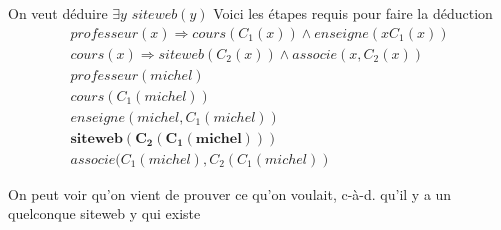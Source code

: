 \documentclass[oneside]{book}
\begin{document}
\noindent On veut déduire $\exists y$ $siteweb(y)$
\noindent Voici les étapes requis pour faire la déduction
\setcounter{equation}{0}
\begin{align}
professeur(x) \Rightarrow cours(C_1(x))\wedge enseigne(x C_1(x))\\
cours(x)\Rightarrow siteweb(C_2(x))\wedge associe(x, C_2(x))\\
professeur(michel)\\
cours(C_1(michel))\\
enseigne(michel, C_1(michel))\\
\mathbf{siteweb(C_2(C_1(michel)))}\\
associe(C_1(michel), C_2(C_1(michel))
\end{align}

On peut voir qu'on vient de prouver ce qu'on voulait, c-à-d. qu'il y a un quelconque siteweb y qui existe
\end{document}
